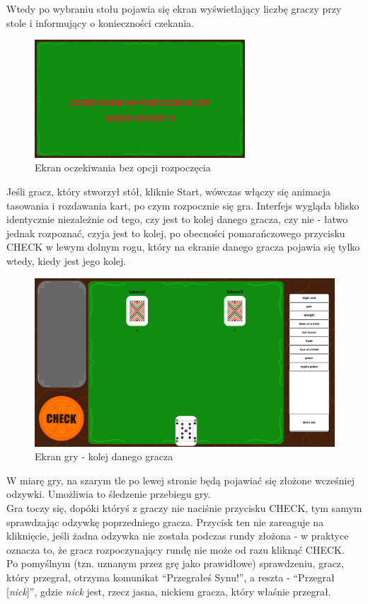 \documentclass{article}
\begin{document}
Wtedy po wybraniu stołu pojawia się ekran wyświetlający liczbę graczy przy stole i informujący o konieczności czekania.

\begin{figure}[h!]
\centering
\includegraphics[width=0.7\textwidth]{stoloczekujacy}
\caption{Ekran oczekiwania bez opcji rozpoczęcia}
\end{figure}

Jeśli gracz, który stworzył stół, kliknie Start, wówczas włączy się animacja tasowania i rozdawania kart, po czym rozpocznie się gra. Interfejs wygląda blisko identycznie niezależnie od tego, czy jest to kolej danego gracza, czy nie - łatwo jednak rozpoznać, czyja jest to kolej, po obecności pomarańczowego przycisku CHECK w lewym dolnym rogu, który na ekranie danego gracza pojawia się tylko wtedy, kiedy jest jego kolej.
\newline

\begin{figure}[H]
\centering
\includegraphics[width=\textwidth]{basicwidok}
\caption{Ekran gry - kolej danego gracza}
\end{figure}


W miarę gry, na szarym tle po lewej stronie będą pojawiać się złożone wcześniej odzywki. Umożliwia to śledzenie przebiegu gry.\\
Gra toczy się, dopóki któryś z graczy nie naciśnie przycisku CHECK, tym samym sprawdzając odzywkę poprzedniego gracza. Przycisk ten nie zareaguje na kliknięcie, jeśli żadna odzywka nie została podczas rundy złożona - w praktyce oznacza to, że gracz rozpoczynający rundę nie może od razu kliknąć CHECK.\\
Po pomyślnym (tzn. uznanym przez grę jako prawidłowe) sprawdzeniu, gracz, który przegrał, otrzyma komunikat ``Przegrałeś Synu!'', a reszta - ``Przegrał [\textit{nick}]'', gdzie \textit{nick} jest, rzecz jasna, nickiem gracza, który właśnie przegrał.
\end{document}
